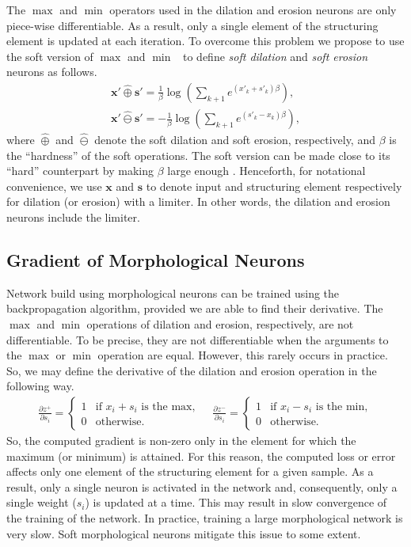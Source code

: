 \documentclass{bmvc2k}
\def\vs{{\bm{s}}}
\def\vx{{\bm{x}}}
\def\evs{{s}}
\def\evx{{x}}
\begin{document}
The $\max$ and $\min$ operators used in the dilation and erosion neurons are only piece-wise differentiable. As a result, only a single element of the structuring element is updated at each iteration. To overcome this problem we propose to use the soft version of $\max$ and $\min$~\cite{cook2011basic} to define \emph{soft dilation} and \emph{soft erosion} neurons as follows.
\begin{align}
    \vx' \hat{\oplus} \vs'  = {\frac{1}{\beta}\log\left( \sum_{k+1} e^{(\evx'_k+\evs'_k)\beta}\right)},  \\
    \vx' \hat{\ominus} \vs'  = -{\frac{1}{\beta}\log\left(\sum_{k+1} e^{(\evs'_k-\evx_k)\beta}\right)},
    \label{eq:softdilationerosion}
\end{align}
where $\hat{\oplus}$ and $\hat{\ominus}$ denote the soft dilation and soft erosion, respectively, and $\beta$ is the ``hardness'' of the soft operations. The soft version can be made close to its ``hard'' counterpart by making $\beta$ large enough \cite{cook2011basic}. Henceforth, for notational convenience, we use $\vx$ and $\vs$ to denote input and structuring element respectively for dilation (or erosion) with a limiter. In other words, the dilation and erosion neurons include the limiter. 

\subsection{Gradient of Morphological Neurons} 
\label{sec:decision_boundary}
Network build using morphological neurons can be trained using the backpropagation algorithm, provided we are able to find their derivative.
The $\max$ and $\min$ operations of dilation and erosion, respectively, are not differentiable. To be precise, they are not differentiable when the arguments to the $\max$ or $\min$ operation are equal. However, this rarely occurs in practice. So, we may define the derivative of the dilation and erosion operation in the following way.
\begin{align}
    \frac{\partial z^+}{\partial s_i} = 
    \begin{cases}
        1 & \text{if $x_i+s_i$ is the max}, \\
        0 & \text{otherwise}.
    \end{cases} 
    \quad
    \frac{\partial z^-}{\partial s_i} = 
    \begin{cases} 
        1 & \text{if $x_i-s_i$ is the min}, \\
        0 & \text{otherwise}.
    \end{cases}
    \label{gradeq}
\end{align}
So, the computed gradient is non-zero only in the element for which the maximum (or minimum) is attained. For this reason, the computed loss or error affects only one element of the structuring element for a given sample. 
As a result, only a single neuron is activated in the network and, consequently, only a single weight ($s_i$) is updated at a time. 
This may result in slow convergence of the training of the network. In practice, training a large morphological network is very slow. Soft morphological neurons mitigate this issue to some extent. 
\end{document}
